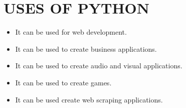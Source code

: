 \documentclass{article}
\begin{document}
	\section*{USES OF PYTHON}
	\begin{itemize}
		\item It can be used for web development.
		\item It can be used to create business applications.
		\item It can be used to create audio and visual applications.
		\item It can be used to create games.
		\item It can be used create web scraping applications.
	\end{itemize}
\end{document}
